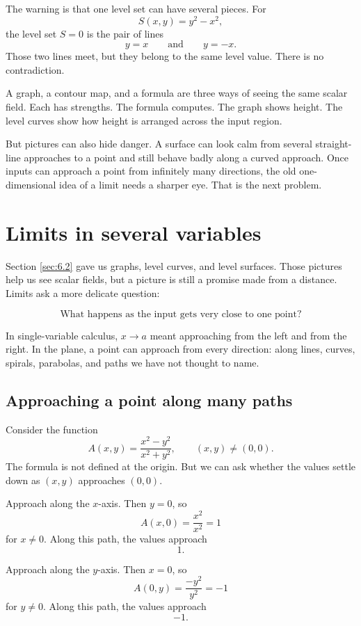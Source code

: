 The warning is that one level set can have several pieces.  For
\[
    S(x,y)=y^2-x^2,
\]
the level set \(S=0\) is the pair of lines
\[
    y=x
    \qquad\text{and}\qquad
    y=-x.
\]
Those two lines meet, but they belong to the same level value.  There is no
contradiction.

A graph, a contour map, and a formula are three ways of seeing the same scalar field.
Each has strengths.  The formula computes.  The graph shows height.  The level curves
show how height is arranged across the input region.

But pictures can also hide danger.  A surface can look calm from several straight-line
approaches to a point and still behave badly along a curved approach.  Once inputs can
approach a point from infinitely many directions, the old one-dimensional idea of a
limit needs a sharper eye.  That is the next problem.
\section{Limits in several variables}
\label{sec:6.3}

Section \ref{sec:6.2} gave us graphs, level curves, and level surfaces.  Those pictures
help us see scalar fields, but a picture is still a promise made from a distance.  Limits ask
a more delicate question:

\[
    \text{What happens as the input gets very close to one point?}
\]

In single-variable calculus, \(x\to a\) meant approaching from the left and from the right.
In the plane, a point can approach from every direction: along lines, curves, spirals,
parabolas, and paths we have not thought to name.

\subsection{Approaching a point along many paths}

Consider the function
\[
    A(x,y)=\frac{x^2-y^2}{x^2+y^2},
    \qquad (x,y)\ne(0,0).
\]
The formula is not defined at the origin.  But we can ask whether the values settle down
as \((x,y)\) approaches \((0,0)\).

Approach along the \(x\)-axis.  Then \(y=0\), so
\[
    A(x,0)=\frac{x^2}{x^2}=1
\]
for \(x\ne0\).  Along this path, the values approach
\[
    1.
\]

Approach along the \(y\)-axis.  Then \(x=0\), so
\[
    A(0,y)=\frac{-y^2}{y^2}=-1
\]
for \(y\ne0\).  Along this path, the values approach
\[
    -1.
\]

